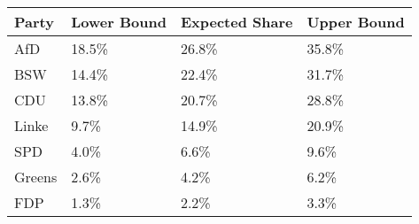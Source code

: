 \begin{tabular}{llll}
  \hline
Party & Lower Bound & Expected Share & Upper Bound \\ 
  \hline
AfD & 18.5\% & 26.8\% & 35.8\% \\ 
  BSW & 14.4\% & 22.4\% & 31.7\% \\ 
  CDU & 13.8\% & 20.7\% & 28.8\% \\ 
  Linke & 9.7\% & 14.9\% & 20.9\% \\ 
  SPD & 4.0\% & 6.6\% & 9.6\% \\ 
  Greens & 2.6\% & 4.2\% & 6.2\% \\ 
  FDP & 1.3\% & 2.2\% & 3.3\% \\ 
   \hline
\end{tabular}
